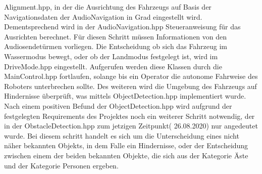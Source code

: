 \documentclass[conference]{IEEEtran}
\begin{document}
{Alignment.hpp, in der die Ausrichtung des Fahrzeugs auf Basis der Navigationsdaten der AudioNavigation in Grad eingestellt wird. Dementsprechend wird in der AudioNavigation.hpp Steueranweisung für das Ausrichten berechnet. Für diesen Schritt müssen Informationen von den Audiosendetürmen vorliegen. 
Die Entscheidung ob sich das Fahrzeug im Wassermodus bewegt, oder ob der Landmodus festgelegt ist, wird im DriveMode.hpp eingestellt. Aufgerufen werden diese Klassen durch die MainControl.hpp fortlaufen, solange bis ein Operator die autonome Fahrweise des Roboters unterbrechen sollte. Des weiteren wird die Umgebung des Fahrzeugs auf Hindernisse überprüft, was mittels ObjectDetection.hpp implementiert wurde.
Nach einem positiven Befund der ObjectDetection.hpp wird aufgrund der festgelegten Requirements des Projektes noch ein weiterer Schritt notwendig, der in der ObstacleDetection.hpp zum jetzigen Zeitpunkt( 26.08.2020) nur angedeutet wurde. Bei diesem schritt handelt es sich um die Unterscheidung eines nicht näher bekannten Objekts, in dem Falle ein Hindernisse, oder der Entscheidung zwischen einem der beiden bekannten Objekte, die sich aus der Kategorie Äste und der Kategorie Personen ergeben.

}
\end{document}
